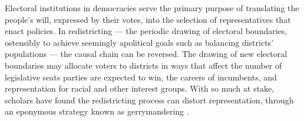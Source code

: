 \documentclass[letter,12pt]{article}
\begin{document}


\onehalfspacing

Electoral institutions in democracies serve the primary purpose of translating the people's will, expressed by their votes, into the selection of representatives that enact policies. In redistricting --- the periodic drawing of electoral boundaries, ostensibly to achieve seemingly apolitical goals such as balancing districts' populations --- the causal chain can be reversed. The drawing of new electoral boundaries may allocate voters to districts in ways that affect the number of legislative seats parties are expected to win, the careers of incumbents, and representation for racial and other interest groups. With so much at stake, scholars have found the redistricting process can distort representation, through an eponymous strategy known as gerrymandering \citep{mayhew1974vanishingMg,cox.katz.2002,erikson1972malapportionment,engstrom2006redisttrictApsr}. 
\end{document}
